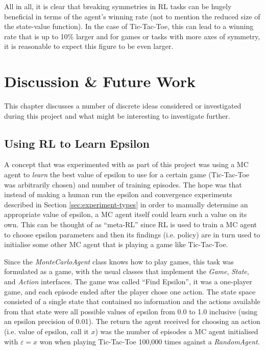 \documentclass[11pt,a4paper]{report}
\begin{document}
All in all, it is clear that breaking symmetries in RL tasks can be hugely beneficial in terms of the agent's winning rate (not to mention the reduced size of the state-value function). In the case of Tic-Tac-Toe, this can lead to a winning rate that is up to 10\% larger and for games or tasks with more axes of symmetry, it is reasonable to expect this figure to be even larger.


\chapter{Discussion \& Future Work}

This chapter discusses a number of discrete ideas considered or investigated during this project and what might be interesting to investigate further.


\section{Using RL to Learn Epsilon}

A concept that was experimented with as part of this project was using a MC agent to \emph{learn} the best value of epsilon to use for a certain game (Tic-Tac-Toe was arbitrarily chosen) and number of training episodes. The hope was that instead of making a human run the epsilon and convergence experiments described in Section \ref{sec:experiment-types} in order to manually determine an appropriate value of epsilon, a MC agent itself could learn such a value on its own. This can be thought of as ``meta-RL'' since RL is used to train a MC agent to choose epsilon parameters and then its findings (i.e. policy) are in turn used to initialise some other MC agent that is playing a game like Tic-Tac-Toe.

Since the \emph{MonteCarloAgent} class knows how to play games, this task was formulated as a game, with the usual classes that implement the \emph{Game}, \emph{State}, and \emph{Action} interfaces. The game was called ``Find Epsilon'', it was a one-player game, and each episode ended after the player chose one action. The state space consisted of a single state that contained no information and the actions available from that state were all possible values of epsilon from 0.0 to 1.0 inclusive (using an epsilon precision of 0.01). The return the agent received for choosing an action (i.e. value of epsilon, call it $x$) was the number of episodes a MC agent initialised with $\varepsilon = x$ won when playing Tic-Tac-Toe 100,000 times against a \emph{RandomAgent}.
\end{document}
